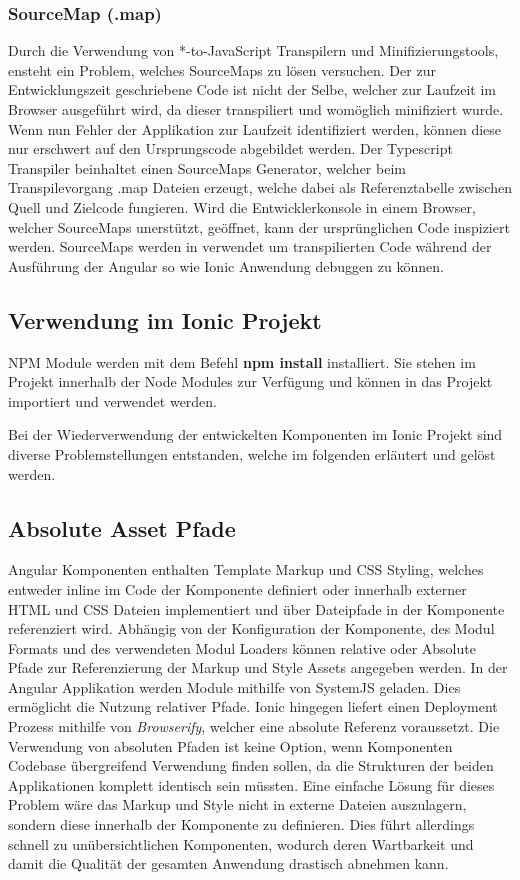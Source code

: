 \subsubsection{SourceMap (.map)}
Durch die Verwendung von *-to-JavaScript Transpilern und Minifizierungstools, ensteht ein Problem, welches SourceMaps zu lösen versuchen.
Der zur Entwicklungszeit geschriebene Code ist nicht der Selbe, welcher zur Laufzeit im Browser ausgeführt wird, da dieser transpiliert und womöglich minifiziert wurde.
Wenn nun Fehler der Applikation zur Laufzeit identifiziert werden, können diese nur erschwert auf den Ursprungscode abgebildet werden.
Der Typescript Transpiler beinhaltet einen SourceMaps Generator, welcher beim Transpilevorgang .map Dateien erzeugt,
welche dabei als Referenztabelle zwischen Quell und Zielcode fungieren.
Wird die Entwicklerkonsole in einem Browser, welcher SourceMaps unerstützt, geöffnet, kann der ursprünglichen Code inspiziert werden.
SourceMaps werden in \projectname{} verwendet um transpilierten Code während der Ausführung der Angular so wie Ionic Anwendung debuggen zu können.
\cite{Using97:online}



\subsection{Verwendung im Ionic Projekt}
\ac{NPM} Module werden mit dem Befehl \textbf{npm install} installiert.
Sie stehen im Projekt innerhalb der Node Modules zur Verfügung und können in das Projekt importiert und verwendet werden.

Bei der Wiederverwendung der entwickelten Komponenten im Ionic Projekt sind diverse Problemstellungen entstanden,
welche im folgenden erläutert und gelöst werden.

\subsection{Absolute Asset Pfade}

Angular Komponenten enthalten Template Markup und \ac{CSS} Styling, welches entweder inline im Code der Komponente
definiert oder innerhalb externer \ac{HTML} und \ac{CSS} Dateien implementiert und über Dateipfade in der Komponente referenziert wird.
Abhängig von der Konfiguration der Komponente, des Modul Formats und des verwendeten Modul Loaders
können relative oder Absolute Pfade zur Referenzierung der Markup und Style Assets angegeben werden.
In der Angular Applikation werden Module mithilfe von SystemJS geladen. Dies ermöglicht die Nutzung relativer Pfade.
Ionic hingegen liefert einen Deployment Prozess mithilfe von \emph{Browserify}, welcher eine absolute Referenz voraussetzt.
Die Verwendung von absoluten Pfaden ist keine Option, wenn Komponenten Codebase übergreifend Verwendung finden sollen,
da die Strukturen der beiden Applikationen komplett identisch sein müssten.
Eine einfache Lösung für dieses Problem wäre das Markup und Style nicht in externe Dateien auszulagern,
sondern diese innerhalb der Komponente zu definieren.
Dies führt allerdings schnell zu unübersichtlichen Komponenten,
wodurch deren Wartbarkeit und damit die Qualität der gesamten Anwendung drastisch abnehmen kann.

